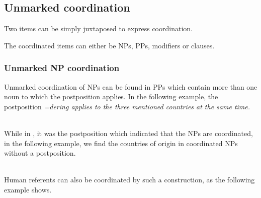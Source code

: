 \subsection{Unmarked coordination}\label{sec:constr:Unmarkedcoordination}
Two items can be simply juxtaposed to express coordination.


The coordinated items can either be  NPs, PPs, modifiers or clauses.

\subsubsection{Unmarked NP coordination}\label{sec:constr:UnmarkedNPcoordination}
Unmarked coordination of NPs can be found in PPs which contain more than one noun to which the postposition applies. In the following example, the postposition \em =dering \em applies to the three mentioned countries at the same time.

 \\ 

While in , it was the postposition which indicated that the NPs are coordinated, in the following example, we find the countries of origin in  coordinated NPs without a postposition.

 \\
Human referents can also be coordinated by such a construction, as the following example shows.


